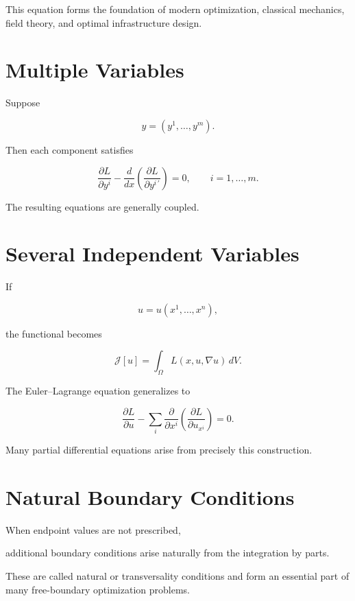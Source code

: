 \documentclass[11pt,fleqn]{book}
\numberwithin{equation}{chapter}
\theoremstyle{plain}
\theoremstyle{definition}
\theoremstyle{remark}
\begin{document}
This equation forms the foundation of modern optimization,
classical mechanics,
field theory,
and optimal infrastructure design.


\section{Multiple Variables}

Suppose

\[
y=(y^1,\ldots,y^m).
\]

Then each component satisfies

\[
\boxed{
\frac{\partial L}{\partial y^i}
-
\frac{d}{dx}
\left(
\frac{\partial L}{\partial y^{i\,\prime}}
\right)
=
0,
\qquad
i=1,\ldots,m.
}
\]

The resulting equations are generally coupled.


\section{Several Independent Variables}

If

\[
u=u(x^1,\ldots,x^n),
\]

the functional becomes

\[
\mathcal J[u]
=
\int_\Omega
L
(x,u,\nabla u)
\,dV.
\]

The Euler--Lagrange equation generalizes to

\[
\boxed{
\frac{\partial L}{\partial u}
-
\sum_i
\frac{\partial}{\partial x^i}
\left(
\frac{\partial L}
{\partial u_{x^i}}
\right)
=
0.
}
\]

Many partial differential equations arise from precisely this
construction.


\section{Natural Boundary Conditions}

When endpoint values are not prescribed,

additional boundary conditions arise naturally from the integration by
parts.

These are called natural or transversality conditions and form an
essential part of many free-boundary optimization problems.
\end{document}
